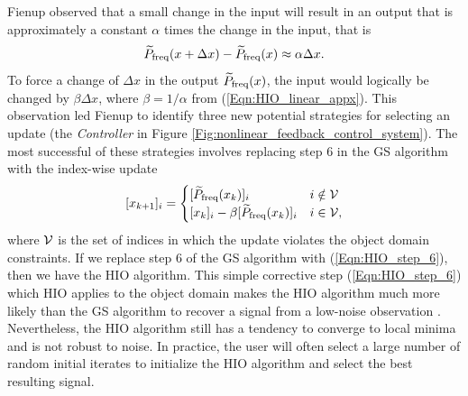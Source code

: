 Fienup observed that a small change in the input will result in an output that is approximately a constant $\alpha$ times the change in the input, that is
\begin{equation} 		\label{Eqn:HIO_linear_appx}
	\widetilde{P}_\textnormal{freq}(x + \Delta x) - \widetilde{P}_\textnormal{freq}(x) \approx \alpha \Delta x.
\end{equation}
To force a change of $\Delta x$ in the output $\widetilde{P}_\textnormal{freq}(x)$, the input would logically be changed by $\beta \Delta x$, where $\beta = 1/\alpha$ from (\ref{Eqn:HIO_linear_appx}).  
This observation led Fienup to identify three new potential strategies for selecting an update (the \textit{Controller} in Figure \ref{Fig:nonlinear_feedback_control_system}).  
The most successful of these strategies involves replacing step 6 in the GS algorithm with the index-wise update
\begin{equation} 		\label{Eqn:HIO_step_6}
[x_{k+1}]_i =
	\begin{cases}
		[\widetilde{P}_\textnormal{freq}(x_k)]_i	&	i \notin {\mathcal V}		\\
		[x_k]_i - \beta [\widetilde{P}_\textnormal{freq}(x_k)]_i			&	 i \in {\mathcal V},
	\end{cases}
\end{equation}
where ${\mathcal V}$ is the set of indices in which the update violates the object domain constraints.
If we replace step 6 of the GS algorithm with (\ref{Eqn:HIO_step_6}), then we have the HIO algorithm.
This simple corrective step (\ref{Eqn:HIO_step_6}) which HIO applies to the object domain makes the HIO algorithm much more likely than the GS algorithm to recover a signal from a low-noise observation \cite{DBLP:journals/corr/JaganathanEH15a}.   
Nevertheless, the HIO algorithm still has a tendency to converge to local minima and is not robust to noise.  
In practice, the user will often select a large number of random initial iterates to initialize the HIO algorithm and select the best resulting signal.




